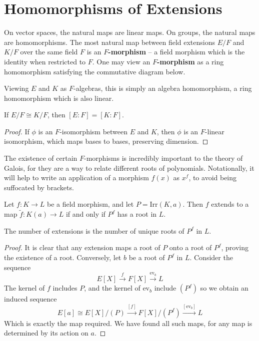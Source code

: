 \section{Homomorphisms of Extensions}

On vector spaces, the natural maps are linear maps. On groups, the natural maps are homomorphisms. The most natural map between field extensions $E/F$ and $K/F$ over the same field $F$ is an {\bf $F$-morphism} -- a field morphism which is the identity when restricted to $F$. One may view an {\bf $F$-morphism} as a ring homomorphism satisfying the commutative diagram below.
%
\begin{center}
\end{center}
%
Viewing $E$ and $K$ as $F$-algebras, this is simply an algebra homomorphism, a ring homomorphism which is also linear.

\begin{lemma}
    If $E/F \cong K/F$, then $[E:F] = [K:F]$.
\end{lemma}
\begin{proof}
    If $\phi$ is an $F$-isomorphism between $E$ and $K$, then $\phi$ is an $F$-linear isomorphism, which maps bases to bases, preserving dimension.
\end{proof}

The existence of certain $F$-morphisms is incredibly important to the theory of Galois, for they are a way to relate different roots of polynomials. Notationally, it will help to write an application of a morphism $f(x)$ as $x^f$, to avoid being suffocated by brackets.

\begin{lemma}
    Let $f:K \to L$ be a field morphism, and let $P = \text{Irr}(K,a)$. Then $f$ extends to a map $\tilde{f}:K(a) \to L$ if and only if $P^f$ has a root in $L$.
    \begin{center}
    \end{center}
    The number of extensions is the number of unique roots of $P^f$ in $L$.
\end{lemma}
\begin{proof}
    It is clear that any extension maps a root of $P$ onto a root of $P^f$, proving the existence of a root. Conversely, let $b$ be a root of $P^f$ in $L$. Consider the sequence
    \[ E[X] \xrightarrow{f} F[X] \xrightarrow{\text{ev}_b} L \]
    The kernel of $f$ includes $P$, and the kernel of $\text{ev}_b$ include $(P^f)$ so we obtain an induced sequence
    \[ E[a] \cong E[X]/(P) \xrightarrow{[f]} F[X]/(P^f) \xrightarrow{[\text{ev}_b]} L \]
    Which is exactly the map required. We have found all such maps, for any map is determined by its action on $a$.
\end{proof}

